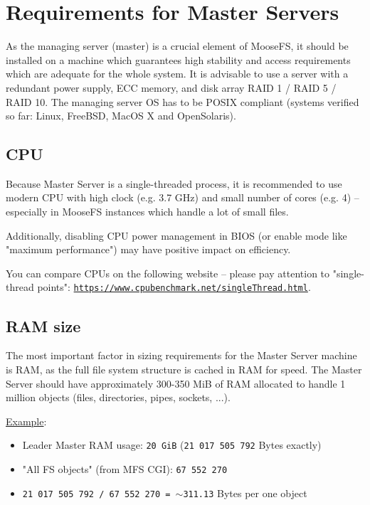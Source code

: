 \documentclass[a4paper,11pt,english]{report}
\def\code#1{\texttt{#1}}
\begin{document}
		\section{Requirements for Master Servers}
		As the managing server (master) is a crucial element of MooseFS, it should be installed on a machine which guarantees high stability and access requirements which are adequate for the whole system. It is advisable to use a server with a redundant power supply, ECC memory, and disk array RAID 1 / RAID 5 / RAID 10. The managing server OS has to be POSIX compliant (systems verified so far: Linux, FreeBSD, MacOS X and OpenSolaris).

			\subsection{CPU}
			
			Because Master Server is a single-threaded process, it is recommended to use modern CPU with high clock (e.g. 3.7 GHz) and small number of cores (e.g. 4) -- especially in MooseFS instances which handle a lot of small files.
			
			Additionally, disabling CPU power management in BIOS (or enable mode like "maximum performance") may have positive impact on efficiency.
			
			You can compare CPUs on the following website -- please pay attention to "single-thread points": \code{\url{https://www.cpubenchmark.net/singleThread.html}}.
			

			\subsection{RAM size}
			
			The most important factor in sizing requirements for the Master Server machine is RAM, as the full file system structure is cached in RAM for speed. The Master Server should have approximately 300-350 MiB of RAM allocated to handle 1 million objects (files, directories, pipes, sockets, ...).
			
			\underline{Example}:
			\begin{itemize}
				\item Leader Master RAM usage: \code{20 GiB} (\code{21 017 505 792} Bytes exactly)
				\item "All FS objects" (from MFS CGI): \code{67 552 270}
				\item \code{21 017 505 792 / 67 552 270 = $\sim$311.13} Bytes per one object
			\end{itemize}
			
\end{document}
